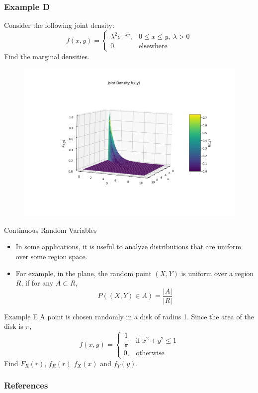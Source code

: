 \documentclass{beamer}
\begin{document}
\begin{frame}
    \frametitle{Example D}

    Consider the following joint density:
    \[f(x,y)= \begin{cases}
        \lambda^2 e^{-\lambda y}, & 0 \leq x \leq y, ~\lambda >0\\
        0, & \text{elsewhere}
    \end{cases}\] Find the marginal densities. 
    \begin{figure}
        \includegraphics[scale=0.4]{Figures/fig_9.png}
    \end{figure}
    

\end{frame}

\begin{frame}{Continuous Random Variables}
    \begin{itemize}
        \item In some applications, it is useful to analyze distributions that are uniform over some region space. 
        \item For example, in the plane, the random point \((X,Y)\) is uniform over a region \(R\), if for any \(A \subset R\), \[P((X,Y) \in A)=\dfrac{|A|}{|R|}\]
    \end{itemize}    
\end{frame}

\begin{frame}{Example E}
    A point is chosen randomly in a disk of radius 1. Since the area of the disk is \(\pi\), \[f(x,y)= \begin{cases}
        \dfrac{1}{\pi} & \text{if }x^2+y^2\leq 1\\
        0, & \text{otherwise}
    \end{cases}\] Find \(F_R(r)\), \(f_R(r)\)  \(f_X(x)\) and \(f_Y(y)\). 
\end{frame}


\begin{frame}
    \frametitle{References}
\end{frame}
\end{document}
